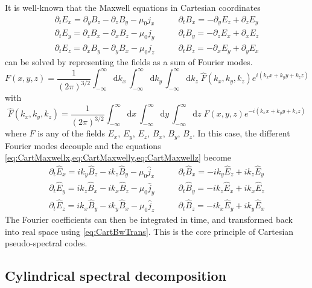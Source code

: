 \documentclass[a4paper]{article}   	%
\newcommand{\Integ}[1]{\int_{-\infty}^{\infty} \!\!\!\!\!
  \mathrm{d}#1}
\begin{document}
It is well-known that the Maxwell equations in Cartesian coordinates 
\begin{align}
\partial_t E_x = \partial_y B_z - \partial_z B_y - \mu_0  j_x \qquad&   
\partial_t B_x = -\partial_y E_z + \partial_z E_y \label{eq:CartMaxwellx} \\
\partial_t E_y = \partial_z B_x - \partial_x B_z - \mu_0  j_y \qquad &   
\partial_t B_y = -\partial_z E_x + \partial_x E_z \label{eq:CartMaxwelly}  \\
\partial_t E_z = \partial_x B_y - \partial_y B_x - \mu_0  j_z \qquad &   
\partial_t B_z = -\partial_x E_y + \partial_y E_x \label{eq:CartMaxwellz} 
\end{align}
can be solved by representing the fields as a sum of Fourier modes.
\begin{equation}
\label{eq:CartBwTrans}
F(x,y,z) = \frac{1}{(2\pi)^{3/2}}\Integ{k_x} \,\Integ{k_y}\, \Integ{k_z} \; \hat{F}(k_x,k_y,k_z) e^{i(k_x x + k_y y + k_z z)} 
\end{equation}
with 
\begin{equation}
\label{eq:CartFwTrans}
\hat{F}(k_x,k_y,k_z)  = \frac{1}{(2\pi)^{3/2}}\Integ{x} \,\Integ{y}\, \Integ{z} \; F(x,y,z) e^{-i(k_x x + k_y y + k_z z)} 
\end{equation}
where $F$ is any of the fields $E_x$, $E_y$, $E_z$, $B_x$, $B_y$, $B_z$. In this case, the different Fourier modes decouple and the equations \cref{eq:CartMaxwellx,eq:CartMaxwelly,eq:CartMaxwellz} become 
\begin{align}
\partial_t \hat{E}_x = ik_y \hat{B}_z - ik_z \hat{B}_y - \mu_0 \hat{j}_x \qquad &   
\partial_t \hat{B}_x = -ik_y \hat{E}_z + ik_z \hat{E}_y \\
\partial_t \hat{E}_y = ik_z \hat{B}_x - ik_x \hat{B}_z - \mu_0  \hat{j}_y \qquad &   
\partial_t \hat{B}_y = -ik_z \hat{E}_x + ik_x \hat{E}_z \\
\partial_t \hat{E}_z = ik_x \hat{B}_y - ik_y \hat{B}_x - \mu_0 \hat{j}_z  \qquad &   
\partial_t \hat{B}_z = -ik_x \hat{E}_y + ik_y \hat{E}_x 
\end{align}
The Fourier coefficients can then be integrated in time, and
transformed back into real space using \cref{eq:CartBwTrans}. This is
the core principle of Cartesian pseudo-spectral codes.

\subsection{Cylindrical spectral decomposition}
\end{document}
